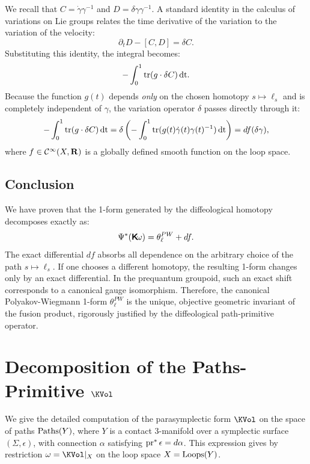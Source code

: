 \documentclass[11pt,reqno,letterpaper,twoside]{amsart}
\renewcommand{\Komega}{\CHO\!\omega}
\begin{document}
  We recall that $C = \dot{\gamma}\gamma^{-1}$ and $D = \delta\gamma \gamma^{-1}$.
  A standard identity in the calculus of variations on Lie groups relates the time derivative of the variation to the variation of the velocity:
  \[
    \partial_t D - [C, D] = \delta C.
    \]
  Substituting this identity,
  the integral becomes:
  \[
    - \int_0^1 \operatorname{tr}(g \cdot \delta C) \, \mathrm{dt}.
    \]
  Because the function $g(t)$ depends \emph{only} on the chosen homotopy $s \mapsto \ell_s$ and is completely independent of $\gamma$,
  the variation operator $\delta$ passes directly through it:
  \[
    - \int_0^1 \operatorname{tr}(g \cdot \delta C) \, \mathrm{dt} = \delta \left( - \int_0^1 \operatorname{tr}(g(t) \dot{\gamma}(t)\gamma(t)^{-1}) \, \mathrm{dt} \right) = df(\delta\gamma),
    \]
  where $f \in {\mathcal{C}}^\infty(X, {\mathbf{R}})$ is a globally defined smooth function on the loop space.
  
  \subsection{Conclusion}
  We have proven that the 1-form generated by the diffeological homotopy decomposes exactly as:
  \[
    \Psi^*(\Komega) = \theta^{PW}_\ell + df.
    \]
  The exact differential $df$ absorbs all dependence on the arbitrary choice of the path $s \mapsto \ell_s$.
  If one chooses a different homotopy,
  the resulting 1-form changes only by an exact differential.
  In the prequantum groupoid,
  such an exact shift corresponds to a canonical gauge isomorphism.
  Therefore,
  the canonical Polyakov-Wiegmann 1-form $\theta^{PW}_\ell$ is the unique,
  objective geometric invariant of the fusion product,
  rigorously justified by the diffeological path-primitive operator.
  
  
  \section{Decomposition of the Paths-Primitive $\KVol$}
  \label{Decomposition of the Paths-Primitive}
  
  We give the detailed computation of the parasymplectic form
  $\KVol$ on the space of paths $\operatorname{Paths}(Y)$,
  where $Y$ is a contact $3$-manifold over a symplectic surface $(\Sigma, \epsilon)$,
  with connection $\alpha$ satisfying $\pr^*\epsilon = d\alpha$.
  This expression gives by restriction $\omega = \KVol|_X$ on the loop space $X = \operatorname{Loops}(Y)$.
  
\end{document}
